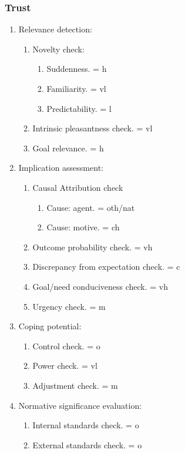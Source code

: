 \subsubsection{Trust}

\begin{enumerate}
 \item  Relevance detection:
 \begin{enumerate}
  \item  Novelty check:
  \begin{enumerate}
   \item  Suddenness. = h
   \item  Familiarity. = vl
   \item  Predictability. = l
  \end{enumerate}
  \item  Intrinsic pleasantness check. = vl
  \item  Goal relevance. = h
 \end{enumerate}
 \item  Implication assessment:
 \begin{enumerate}
  \item  Causal Attribution check
  \begin{enumerate}
   \item  Cause: agent. = oth/nat
   \item  Cause: motive. = ch
  \end{enumerate}
  \item  Outcome probability check. = vh
  \item  Discrepancy from expectation check. = c
  \item  Goal/need conduciveness check. = vh
  \item  Urgency check. = m
 \end{enumerate}
 \item  Coping potential:
 \begin{enumerate}
  \item  Control check. = o
  \item  Power check. = vl
  \item  Adjustment check. = m
 \end{enumerate}
 \item  Normative significance evaluation:
 \begin{enumerate}
  \item  Internal standards check. = o
  \item  External standards check. = o
 \end{enumerate}
\end{enumerate}
